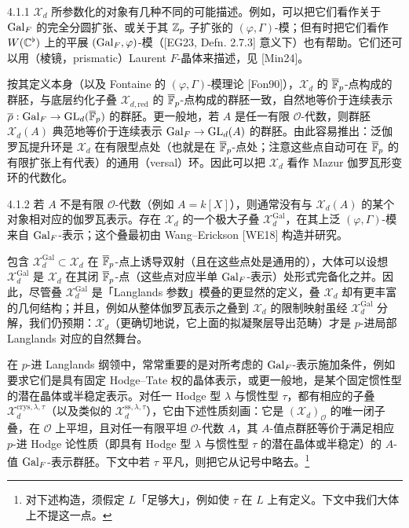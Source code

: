 \begin{rem}{4.1.1}
$\mathcal X_d$ 所参数化的对象有几种不同的可能描述。例如，可以把它们看作关于 $\operatorname{Gal}_F$ 的完全分圆扩张、或关于其 $\mathbb{Z}_p$ 子扩张的 $(\varphi,\Gamma)$-模；但有时把它们看作 $W(\mathbb{C}^{\flat})$ 上的平展 $(\operatorname{Gal}_F,\varphi)$-模（[EG23, Defn. 2.7.3] 意义下）也有帮助。它们还可以用（棱镜，prismatic）Laurent $F$-晶体来描述，见 [Min24]。
\end{rem}

按其定义本身（以及 Fontaine 的 $(\varphi,\Gamma)$-模理论 [Fon90]），$\mathcal X_d$ 的 $\overline{\mathbb{F}}_p$-点构成的群胚，与底层约化子叠 $\mathcal X_{d,\mathrm{red}}$ 的 $\overline{\mathbb{F}}_p$-点构成的群胚一致，自然地等价于连续表示 $\overline{\rho}:\operatorname{Gal}_F\to\mathrm{GL}_d(\overline{\mathbb{F}}_p)$ 的群胚。更一般地，若 $A$ 是任一有限 $\mathcal O$-代数，则群胚 $\mathcal X_d(A)$ 典范地等价于连续表示 $\operatorname{Gal}_F\to\mathrm{GL}_d(A)$ 的群胚。由此容易推出：泛伽罗瓦提升环是 $\mathcal X_d$ 在有限型点处（也就是在 $\overline{\mathbb{F}}_p$-点处；注意这些点自动可在 $\overline{\mathbb{F}}_p$ 的有限扩张上有代表）的通用（versal）环。因此可以把 $\mathcal X_d$ 看作 Mazur 伽罗瓦形变环的代数化。

\begin{rem}{4.1.2}
若 $A$ 不是有限 $\mathcal O$-代数（例如 $A=k[X]$），则通常没有与 $\mathcal X_d(A)$ 的某个对象相对应的伽罗瓦表示。存在 $\mathcal X_d$ 的一个极大子叠 $\mathcal X_d^{\mathrm{Gal}}$，在其上泛 $(\varphi,\Gamma)$-模来自 $\operatorname{Gal}_F$-表示；这个叠最初由 Wang--Erickson [WE18] 构造并研究。
\end{rem}

包含 $\mathcal X_d^{\mathrm{Gal}}\subset\mathcal X_d$ 在 $\overline{\mathbb{F}}_p$-点上诱导双射（且在这些点处是通用的），大体可以设想 $\mathcal X_d^{\mathrm{Gal}}$ 是 $\mathcal X_d$ 在其闭 $\overline{\mathbb{F}}_p$-点（这些点对应半单 $\operatorname{Gal}_F$-表示）处形式完备化之并。因此，尽管叠 $\mathcal X_d^{\mathrm{Gal}}$ 是「Langlands 参数」模叠的更显然的定义，叠 $\mathcal X_d$ 却有更丰富的几何结构；并且，例如从整体伽罗瓦表示之叠到 $\mathcal X_d$ 的限制映射虽经 $\mathcal X_d^{\mathrm{Gal}}$ 分解，我们仍预期：$\mathcal X_d$（更确切地说，它上面的拟凝聚层导出范畴）才是 $p$-进局部 Langlands 对应的自然舞台。

在 $p$-进 Langlands 纲领中，常常重要的是对所考虑的 $\operatorname{Gal}_F$-表示施加条件，例如要求它们是具有固定 Hodge--Tate 权的晶体表示，或更一般地，是某个固定惯性型的潜在晶体或半稳定表示。对任一 Hodge 型 $\lambda$ 与惯性型 $\tau$，都有相应的子叠 $\mathcal X_d^{\mathrm{crys},\lambda,\tau}$（以及类似的 $\mathcal X_d^{\mathrm{ss},\lambda,\tau}$），它由下述性质刻画：它是 $(\mathcal X_d)_{\mathcal O}$ 的唯一闭子叠，在 $\mathcal O$ 上平坦，且对任一有限平坦 $\mathcal O$-代数 $A$，其 $A$-值点群胚等价于满足相应 $p$-进 Hodge 论性质（即具有 Hodge 型 $\lambda$ 与惯性型 $\tau$ 的潜在晶体或半稳定）的 $A$-值 $\operatorname{Gal}_F$-表示群胚。下文中若 $\tau$ 平凡，则把它从记号中略去。\footnote{对下述构造，须假定 $L$「足够大」，例如使 $\tau$ 在 $L$ 上有定义。下文中我们大体上不提这一点。}

